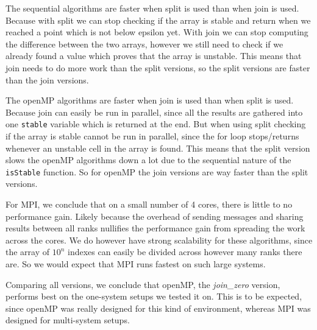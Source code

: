 \documentclass[a4paper]{article}
\begin{document}
The sequential algorithms are faster when split is used than when join is used. Because with split we can stop checking if the array is stable and return when we reached a point which is not below epsilon yet. With join we can stop computing the difference between the two arrays, however we still need to check if we already found a value which proves that the array is unstable. This means that join needs to do more work than the split versions, so the split versions are faster than the join versions.

The openMP algorithms are faster when join is used than when split is used. Because join can easily be run in parallel, since all the results are gathered into one \texttt{stable} variable which is returned at the end. But when using split checking if the array is stable cannot be run in parallel, since the for loop stops/returns whenever an unstable cell in the array is found. This means that the split version slows the openMP algorithms down a lot due to the sequential nature of the \texttt{isStable} function. So for openMP the join versions are way faster than the split versions.

For MPI, we conclude that on a small number of 4 cores, there is little to no performance gain. Likely because the overhead of sending messages and sharing results between all ranks nullifies the performance gain from spreading the work across the cores. We do however have strong scalability for these algorithms, since the array of $10^n$ indexes can easily be divided across however many ranks there are. So we would expect that MPI runs fastest on such large systems.

Comparing all versions, we conclude that openMP, the \textit{join\_zero} version, performs best on the one-system setups we tested it on. This is to be expected, since openMP was really designed for this kind of environment, whereas MPI was designed for multi-system setups.
\end{document}
